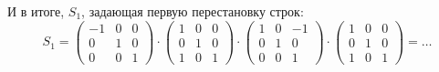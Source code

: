 \documentclass[a4paper,12pt]{article}
\theoremstyle{remark}
\begin{document}
\begin{solution}
    И в итоге, $S_1$, задающая первую перестановку строк:
    \[
      S_1 = \begin{pmatrix}
          -1 & 0 & 0\\
          0 & 1 & 0\\
          0 & 0 & 1
        \end{pmatrix}
      \cdot \begin{pmatrix}
          1 & 0 & 0\\
          0 & 1 & 0\\
          1 & 0 & 1
        \end{pmatrix}
      \cdot \begin{pmatrix}
          1 & 0 & -1\\
          0 & 1 & 0\\
          0 & 0 & 1
        \end{pmatrix}
      \cdot \begin{pmatrix}
          1 & 0 & 0\\
          0 & 1 & 0\\
          1 & 0 & 1
        \end{pmatrix}
      = \ldots
    \]
  \end{solution}
\end{document}

